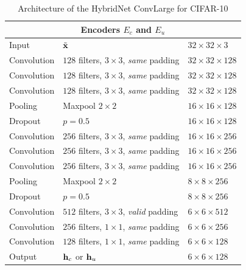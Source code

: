 \begin{table}[htbp]
\centering
\caption{Architecture of the HybridNet ConvLarge for CIFAR-10}
\label{hybridnetA:table:convlarge}
\begin{threeparttable}
\setlength{\tabcolsep}{4pt}
\begin{tabular}{ l l l}
\toprule
\multicolumn{3}{c}{\textbf{Encoders $E_c$ and $E_u$}} \\
\midrule
Input & $\tilde{\mathbf{x}}$ & $32\times 32\times 3$ \\
Convolution & $128$ filters, $3\times3$, \textit{same} padding & $32\times 32\times 128$ \\
Convolution & $128$ filters, $3\times3$, \textit{same} padding & $32\times 32\times 128$ \\
Convolution & $128$ filters, $3\times3$, \textit{same} padding & $32\times 32\times 128$ \\
Pooling   & Maxpool $2\times2$ & $16\times 16\times 128$ \\
Dropout   & $p=0.5$  & $16\times 16\times 128$ \\
Convolution & $256$ filters, $3\times3$, \textit{same} padding  & $16\times 16\times 256$ \\
Convolution & $256$ filters, $3\times3$, \textit{same} padding  & $16\times 16\times 256$ \\
Convolution & $256$ filters, $3\times3$, \textit{same} padding  & $16\times 16\times 256$ \\
Pooling & Maxpool $2\times2$  & $8\times 8\times 256$ \\
Dropout & $p=0.5$  & $8\times 8\times 256$ \\
Convolution & $512$ filters, $3\times3$, \textit{valid} padding  & $6\times 6\times 512$ \\
Convolution & $256$ filters, $1\times1$, \textit{same} padding & $6\times 6\times 256$ \\
Convolution & $128$ filters, $1\times1$, \textit{same} padding & $6\times 6\times 128$ \\
Output & $\mathbf{h}_c$ or $\mathbf{h}_u$ & $6\times 6\times 128$ \\


\end{tabular}
\end{threeparttable}
\end{table}
